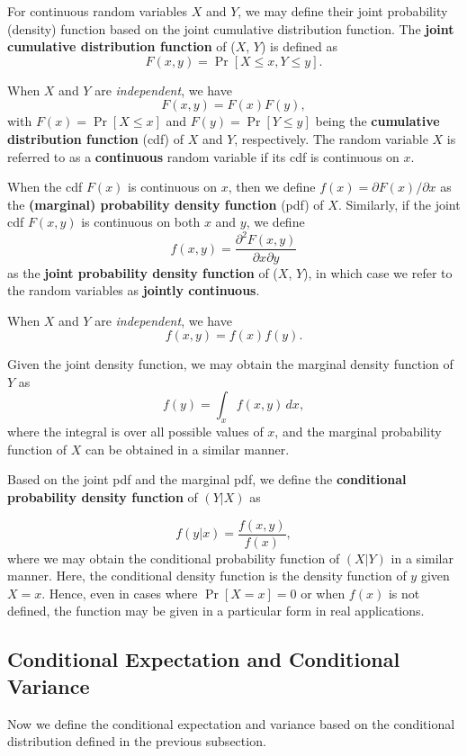 \documentclass[]{book}
\theoremstyle{definition}
\theoremstyle{definition}
\theoremstyle{definition}
\theoremstyle{remark}
\begin{document}
For continuous random variables \(X\) and \(Y\), we may define their
joint probability (density) function based on the joint cumulative
distribution function. The \textbf{joint cumulative distribution
function} of (\(X\), \(Y\)) is defined as
\[F(x,y) = \Pr[X\leq x, Y\leq y].\]

When \(X\) and \(Y\) are \emph{independent}, we have
\[F(x,y)=F(x)F(y),\] with \(F(x)=\Pr[X\leq x]\) and
\(F(y)=\Pr[Y\leq y]\) being the \textbf{cumulative distribution
function} (cdf) of \(X\) and \(Y\), respectively. The random variable
\(X\) is referred to as a \textbf{continuous} random variable if its cdf
is continuous on \(x\).

When the cdf \(F(x)\) is continuous on \(x\), then we define
\(f(x)=\partial F(x)/\partial x\) as the \textbf{(marginal) probability
density function} (pdf) of \(X\). Similarly, if the joint cdf \(F(x,y)\)
is continuous on both \(x\) and \(y\), we define
\[f(x,y)=\frac{\partial^2 F(x,y)}{\partial x\partial y}\] as the
\textbf{joint probability density function} of (\(X\), \(Y\)), in which
case we refer to the random variables as \textbf{jointly continuous}.

When \(X\) and \(Y\) are \emph{independent}, we have
\[f(x,y)=f(x)f(y).\]

Given the joint density function, we may obtain the marginal density
function of \(Y\) as \[f(y)=\int_x f(x,y)\,dx,\] where the integral is
over all possible values of \(x\), and the marginal probability function
of \(X\) can be obtained in a similar manner.

Based on the joint pdf and the marginal pdf, we define the
\textbf{conditional probability density function} of \((Y|X)\) as

\[f(y|x) = \frac{f(x,y)}{f(x)},\] where we may obtain the conditional
probability function of \((X|Y)\) in a similar manner. Here, the
conditional density function is the density function of \(y\) given
\(X=x\). Hence, even in cases where \(\Pr[X=x]=0\) or when \(f(x)\) is
not defined, the function may be given in a particular form in real
applications.

\subsection{Conditional Expectation and Conditional
Variance}\label{conditional-expectation-and-conditional-variance}

Now we define the conditional expectation and variance based on the
conditional distribution defined in the previous subsection.
\end{document}
